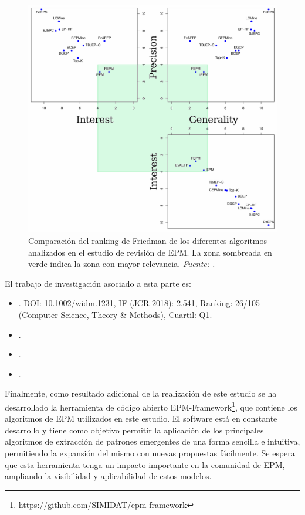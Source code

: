 \documentclass[c5paper,10pt,twoside]{book}	   	%
\newcommand{\doi}[1]{\href{https://doi.org/#1}{#1}}
\begin{document}
\begin{itemize}
	\begin{figure}[!hbtp]
		\centering
		\includegraphics[width=0.7\linewidth]{./Figures/Friedman2.pdf}
		\caption[Comparación del ranking de Friedman de los diferentes algoritmos analizados en el estudio de revisión de EPM.]{Comparación del ranking de Friedman de los diferentes algoritmos analizados en el estudio de revisión de EPM. La zona sombreada en verde indica la zona con mayor relevancia. \textit{Fuente: \cite{Gcmgj18}.}}
		\label{fig:friedman}
	\end{figure}
\end{itemize}

\pagebreak

El trabajo de investigación asociado a esta parte es:

\begin{itemize}
	\item {}. DOI: \doi{10.1002/widm.1231}, IF (JCR 2018): 2.541, Ranking: 26/105 (Computer Science, Theory \& Methods), Cuartil: Q1.
	
	\item {}.
	\item {}.
	\item {}.
\end{itemize}


Finalmente, como resultado adicional de la realización de este estudio se ha desarrollado la herramienta de código abierto  EPM-Framework\footnote{\url{https://github.com/SIMIDAT/epm-framework}}, que contiene los algoritmos de \ac{EPM} utilizados en este estudio. El software está en constante desarrollo y tiene como objetivo permitir la aplicación de los principales algoritmos de extracción de patrones emergentes de una forma sencilla e intuitiva, permitiendo la expansión del mismo con nuevas propuestas fácilmente. Se espera que esta herramienta tenga un impacto importante en la comunidad de \ac{EPM}, ampliando la visibilidad y aplicabilidad de estos modelos.
\end{document}
